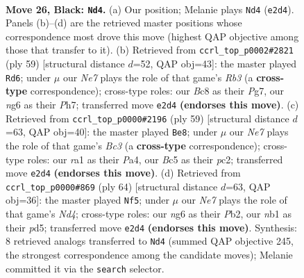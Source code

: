 \documentclass[11pt]{article}
\begin{document}
\clearpage

\begin{figure}[p]\centering
\begin{subfigure}{0.46\textwidth}\centering
\resizebox{\linewidth}{!}{%
\newchessgame
\chessboard[
  setfen={r1bk4/8/2p1p1N1/P1b4p/4PP1P/1p6/3Bn2K/RN6 b - - 0 26},
  showmover=false,
  pgfstyle=straightmove, color=movearrow, markmove={e2-d4}
]}
\caption{}
\end{subfigure}\hfill
\begin{subfigure}{0.46\textwidth}\centering
\resizebox{\linewidth}{!}{%
\newchessgame
\chessboard[
  setfen={5k2/p4ppp/br6/8/3Nn3/1P4P1/2K1P2P/R4B2 b - - 7 30},
  showmover=false,
  pgfstyle=straightmove, color=movearrow, markmove={b6-d6}
]}
\caption{}
\end{subfigure}
\\[4pt]
\begin{subfigure}{0.46\textwidth}\centering
\resizebox{\linewidth}{!}{%
\newchessgame
\chessboard[
  setfen={5br1/4k3/2b1p3/4p3/p1N1P1P1/P2B4/2P5/1K1R4 b - - 0 30},
  showmover=false,
  pgfstyle=straightmove, color=movearrow, markmove={c6-e8}
]}
\caption{}
\end{subfigure}\hfill
\begin{subfigure}{0.46\textwidth}\centering
\resizebox{\linewidth}{!}{%
\newchessgame
\chessboard[
  setfen={5kr1/1p3p2/2bn4/p2p4/3N1RB1/2P4P/PP6/2K5 w - - 1 33},
  showmover=false,
  pgfstyle=straightmove, color=movearrow, markmove={d4-f5}
]}
\caption{}
\end{subfigure}
\caption{\textbf{Move 26, Black: \texttt{Nd4}.} (a) Our position; Melanie plays \texttt{Nd4} (\texttt{e2d4}). Panels (b)--(d) are the retrieved master positions whose correspondence most drove this move (highest QAP objective among those that transfer to it). (b) Retrieved from \texttt{ccrl\_top\_p0002\#2821} (ply 59) [structural distance $d$=52, QAP obj=43]: the master played \texttt{Rd6}; under $\mu$ our \emph{Ne7} plays the role of that game's \emph{Rb3} (a \textbf{cross-type} correspondence); cross-type roles: our \emph{B}c8 as their \emph{P}g7, our \emph{n}g6 as their \emph{P}h7; transferred move \texttt{e2d4} \textbf{(endorses this move)}. (c) Retrieved from \texttt{ccrl\_top\_p0000\#2196} (ply 59) [structural distance $d$=63, QAP obj=40]: the master played \texttt{Be8}; under $\mu$ our \emph{Ne7} plays the role of that game's \emph{Bc3} (a \textbf{cross-type} correspondence); cross-type roles: our \emph{r}a1 as their \emph{P}a4, our \emph{B}c5 as their \emph{p}c2; transferred move \texttt{e2d4} \textbf{(endorses this move)}. (d) Retrieved from \texttt{ccrl\_top\_p0000\#869} (ply 64) [structural distance $d$=63, QAP obj=36]: the master played \texttt{Nf5}; under $\mu$ our \emph{Ne7} plays the role of that game's \emph{Nd4}; cross-type roles: our \emph{n}g6 as their \emph{P}b2, our \emph{n}b1 as their \emph{p}d5; transferred move \texttt{e2d4} \textbf{(endorses this move)}. Synthesis: 8 retrieved analogs transferred to \texttt{Nd4} (summed QAP objective 245, the strongest correspondence among the candidate moves); Melanie committed it via the \texttt{search} selector.}
\label{fig:thought-m51}
\end{figure}
\end{document}
